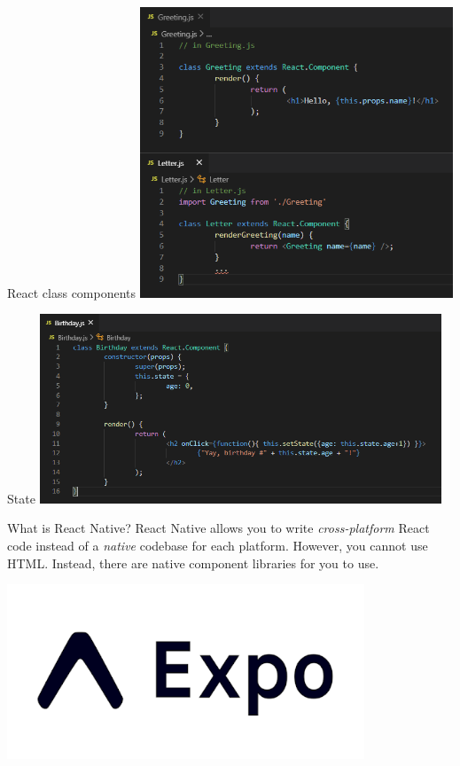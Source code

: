 \documentclass{beamer}
\begin{document}
\begin{frame}{React class components}
	\centering
	\includegraphics[width=0.7\textwidth]{figs/class-components.png}
\end{frame}

\begin{frame}{State}
	\centering
	\includegraphics[width=0.9\textwidth]{figs/state.png}
\end{frame}

\begin{frame}{What is React Native?}
	React Native allows you to write \emph{cross-platform} React code instead of a \emph{native} codebase for each platform. However, you cannot use HTML. Instead,
	there are native component libraries for you to use.

	\bigskip\pause

	\centering
	\includegraphics[width=0.8\textwidth]{figs/expo.png}
\end{frame}
\end{document}
